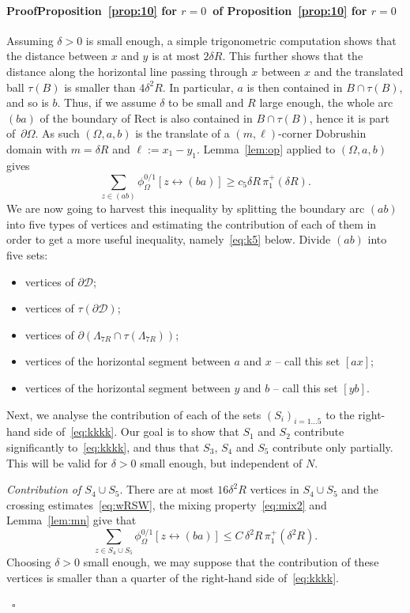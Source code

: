 \documentclass[a4paper,oneside,11pt]{article}
\numberwithin{equation}{section}
\numberwithin{equation}{section}
\numberwithin{equation}{section}
\newenvironment{proof}[1][\relax]%
  {\paragraph{Proof\ifx#1\relax\else~of #1\fi}}%
  {~\hfill$\square$\par\bigskip}
\newcommand{\calD}{\mathcal{D}}
\newcommand{\La}{\Lambda}
\begin{document}
\begin{proof}[Proposition~\ref{prop:10} for $r=0$]
Assuming $\delta > 0$ is small enough, a simple trigonometric computation shows that the distance between $x$ and $y$ is at most $2\delta R$. 
This further shows that the distance along the horizontal line passing through $x$ between $x$ 
and the translated ball $\tau(B)$ is smaller than $4\delta^2 R$.
In particular, $a$ is then contained in $B \cap \tau(B)$, and so is $b$. 
Thus, if we assume $\delta$ to be small and $R$ large enough, 
the whole arc $(ba)$ of the boundary of $\mathrm{Rect}$ is also contained in $B \cap \tau(B)$, hence it is part of~$\partial \Omega$. 
As such $(\Omega, a,b)$ is the translate of a $(m ,\ell)$-corner Dobrushin domain with $m = \delta R$ and $\ell:= x_1 - y_1$. 
Lemma~\ref{lem:op} applied to $(\Omega, a,b)$ gives
\begin{equation}\label{eq:kkkk}
	\sum_{z \in (ab)} \phi^{0/1}_\Omega[z\longleftrightarrow (ba)]\ge c_5\delta R\,\pi_1^+(\delta R).
\end{equation} 
We are now going to harvest this inequality by splitting the boundary arc $(ab)$ into five types of vertices and estimating the contribution of each of them in order to get a more useful inequality, namely~\eqref{eq:k5} below. Divide $(ab)$ into five sets: 
\begin{itemize}[noitemsep]
\item[$S_1=$]  vertices of $\partial \calD$;
\item[$S_2=$]  vertices of $\tau(\partial \calD)$;
\item[$S_3=$]  vertices of $\partial (\La_{7R} \cap \tau(\La_{7R}))$;
\item[$S_4=$]  vertices of the horizontal segment between $a$ and $x$ -- call this set $[ax]$;
\item[$S_5=$]  vertices of the horizontal segment between $y$ and $b$ -- call this set $[yb]$.
\end{itemize} 
Next, we analyse the contribution of each of the sets $(S_i)_{i=1\dots5}$ to the right-hand side of~\eqref{eq:kkkk}. 
Our goal is to show that $S_1$ and $S_2$ contribute significantly to~\eqref{eq:kkkk},
and thus that $S_3$, $S_4$ and $S_5$ contribute only partially. This will be valid for $\delta> 0$ small enough, but independent of $N$. 
\smallskip 

\noindent
{\em Contribution  of $S_4\cup S_5$}. 
There are at most $16 \delta^2 R$ vertices in $S_4\cup S_5$ and
the crossing estimates~\eqref{eq:wRSW}, the mixing property~\eqref{eq:mix2} and Lemma~\ref{lem:mn} give that 
\begin{equation}\label{eq:kkk}
	\sum_{z\in S_4 \cup S_5}\phi^{0/1}_\Omega[z\longleftrightarrow (ba)]
	\le C\,\delta^2 R\,\pi_1^+(\delta^2 R).
\end{equation}
Choosing $\delta > 0$ small enough, we may suppose that the contribution of these vertices is smaller than a quarter of the right-hand side of~\eqref{eq:kkkk}.
\bigbreak


\end{proof}
\end{document}
